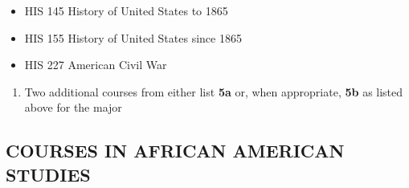 \documentclass[
  letterpaper,
]{scrbook}
\providecommand{\tightlist}{%
  \setlength{\itemsep}{0pt}\setlength{\parskip}{0pt}}
\begin{document}
\begin{itemize}
\tightlist
\item
  HIS 145 History of United States to 1865
\item
  HIS 155 History of United States since 1865
\item
  HIS 227 American Civil War
\end{itemize}

\begin{enumerate}
\def\labelenumi{\arabic{enumi}.}
\setcounter{enumi}{4}
\tightlist
\item
  Two additional courses from either list \textbf{5a} or, when
  appropriate, \textbf{5b} as listed above for the major
\end{enumerate}

\subsection{COURSES IN AFRICAN AMERICAN
STUDIES}\label{sec-courses-in-african-american-studies}
\end{document}
